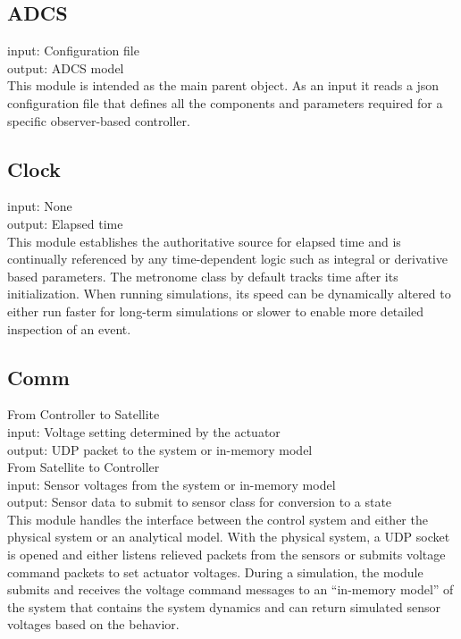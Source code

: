 \subsection{ADCS}
\label{subsec:ADCS}

input: Configuration file\\
output: ADCS model\\

This module is intended as the main parent object.  As an input it reads a json configuration file that defines all the components and parameters required for a specific observer-based controller.


\subsection{Clock}
\label{subsec:Clock}

input: None\\
output: Elapsed time\\

This module establishes the authoritative source for elapsed time and is continually referenced by any time-dependent logic such as integral or derivative based parameters. The metronome class by default tracks time after its initialization.  When running simulations, its speed can be dynamically altered to either run faster for long-term simulations or slower to enable more detailed inspection of an event.


\subsection{Comm}
\label{subsec:Comm}

From Controller to Satellite\\
input: Voltage setting determined by the actuator\\
output: UDP packet to the system or in-memory model\\
From Satellite to Controller\\
input: Sensor voltages from the system or in-memory model\\
output: Sensor data to submit to sensor class for conversion to a state\\

This module handles the interface between the control system and either the physical system or an analytical model. With the physical system, a UDP socket is opened and either listens relieved packets from the sensors or submits voltage command packets to set actuator voltages. During a simulation, the module submits and receives the voltage command messages to an ``in-memory model'' of the system that contains the system dynamics and can return simulated sensor voltages based on the behavior.


